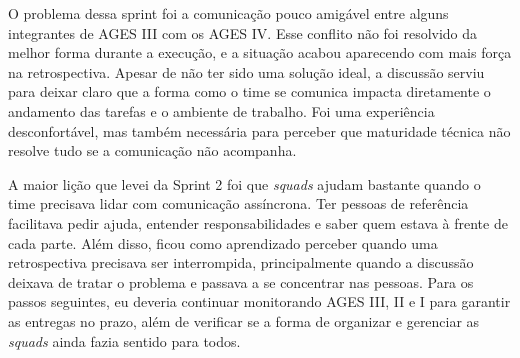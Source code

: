 O problema dessa sprint foi a comunicação pouco amigável entre alguns integrantes de AGES III com os AGES IV. Esse conflito não foi resolvido da melhor forma durante a execução, e a situação acabou aparecendo com mais força na retrospectiva. Apesar de não ter sido uma solução ideal, a discussão serviu para deixar claro que a forma como o time se comunica impacta diretamente o andamento das tarefas e o ambiente de trabalho. Foi uma experiência desconfortável, mas também necessária para perceber que maturidade técnica não resolve tudo se a comunicação não acompanha.

A maior lição que levei da Sprint 2 foi que \textit{squads} ajudam bastante quando o time precisava lidar com comunicação assíncrona. Ter pessoas de referência facilitava pedir ajuda, entender responsabilidades e saber quem estava à frente de cada parte. Além disso, ficou como aprendizado perceber quando uma retrospectiva precisava ser interrompida, principalmente quando a discussão deixava de tratar o problema e passava a se concentrar nas pessoas. Para os passos seguintes, eu deveria continuar monitorando AGES III, II e I para garantir as entregas no prazo, além de verificar se a forma de organizar e gerenciar as \textit{squads} ainda fazia sentido para todos.
